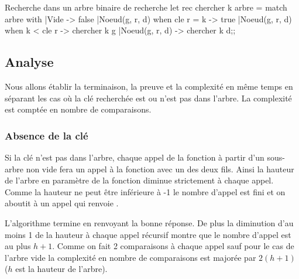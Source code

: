 \begin{figure*}[h]
\centering
{}
\caption{Recherche de 23 dans l'arbre $a_0$}
\end{figure*}
\begin{code}{Recherche dans un arbre binaire de recherche}
let rec chercher k arbre = 
   match arbre with
   |Vide -> false
   |Noeud(g, r, d) when cle r = k -> true
   |Noeud(g, r, d) when k < cle r -> chercher k g
   |Noeud(g, r, d) -> chercher k d;;
\end{code}
\subsection{Analyse}
Nous allons établir la terminaison, la preuve et la complexité en même temps en séparant les cas où la clé recherchée est ou n'est pas dans l'arbre.  La complexité est comptée en nombre de comparaisons.
\subsubsection{Absence de la clé}
 Si la clé n'est pas dans l'arbre, chaque appel de la fonction à partir d'un sous-arbre non vide fera un appel à la fonction avec un des deux fils. Ainsi la hauteur de l'arbre en paramètre de la fonction diminue strictement à chaque appel. Comme la hauteur ne peut être inférieure à -1 le nombre d'appel est fini et on aboutit à un appel  qui renvoie .
 
L'algorithme termine en renvoyant la bonne réponse. De plus la diminution  d'au moins 1 de la hauteur à chaque appel récursif montre que le nombre d'appel est au plus $h+1$. Comme on fait 2 comparaisons à chaque appel sauf pour le cas de l'arbre vide la complexité en nombre de comparaisons est majorée par $2(h+1)$ ($h$ est la hauteur de l'arbre).
